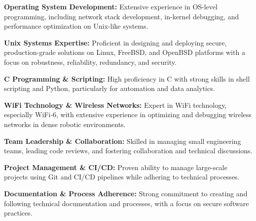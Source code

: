 \documentclass[12pt]{developercv}
\begin{document}
\begin{entrylist}
\entry
{}
{}
{}
{
        \textbf{Operating System Development:} Extensive experience in OS-level programming, including network stack development, in-kernel debugging, and performance optimization on Unix-like systems.

		\textbf{Unix Systems Expertise:} Proficient in designing and deploying secure, production-grade solutions on Linux, FreeBSD, and OpenBSD platforms with a focus on robustness, reliability, redundancy, and security.
		
		\textbf{C Programming \& Scripting:} High proficiency in C with strong skills in shell scripting and Python, particularly for automation and data analytics.
		
		\textbf{WiFi Technology \& Wireless Networks:} Expert in WiFi technology, especially WiFi-6, with extensive experience in optimizing and debugging wireless networks in dense robotic environments.
		
		\textbf{Team Leadership \& Collaboration:} Skilled in managing small engineering teams, leading code reviews, and fostering collaboration and technical discussions.
		
		\textbf{Project Management \& CI/CD:} Proven ability to manage large-scale projects using Git and CI/CD pipelines while adhering to technical processes.
		
		\textbf{Documentation \& Process Adherence:} Strong commitment to creating and following technical documentation and processes, with a focus on secure software practices.
}

\end{entrylist}
\end{document}
